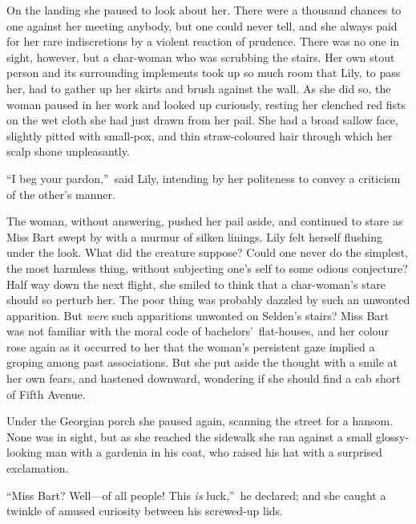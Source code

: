 \documentclass[12pt,a4paper]{book}
\begin{document}
On the landing she paused to look about her. There were a
thousand chances to one against her meeting anybody, but one
could never tell, and she always paid for her rare indiscretions
by a violent reaction of prudence. There was no one in sight,
however, but a char-woman who was scrubbing the stairs. Her own
stout person and its surrounding implements took up so much room
that Lily, to pass her, had to gather up her skirts and brush
against the wall. As she did so, the woman paused in her work and
looked up curiously, resting her clenched red fists on the
wet cloth she had just drawn from her pail. She had a broad
sallow face, slightly pitted with small-pox, and thin
straw-coloured hair through which her scalp shone unpleasantly.





``I beg your pardon,''\ said Lily, intending by her politeness to
convey a criticism of the other's manner.





The woman, without answering, pushed her pail aside, and
continued to stare as Miss Bart swept by with a murmur of silken
linings. Lily felt herself flushing under the look. What did the
creature suppose? Could one never do the simplest, the most
harmless thing, without subjecting one's self to some odious
conjecture? Half way down the next flight, she smiled to think
that a char-woman's stare should so perturb her. The poor thing
was probably dazzled by such an unwonted apparition. But \textit{were}
such apparitions unwonted on Selden's stairs? Miss Bart was not
familiar with the moral code of bachelors'\ flat-houses, and her
colour rose again as it occurred to her that the woman's
persistent gaze implied a groping among past associations. But
she put aside the thought with a smile at her own fears, and
hastened downward, wondering if she should find a cab short of
Fifth Avenue.





Under the Georgian porch she paused again, scanning the street
for a hansom. None was in sight, but as she reached the sidewalk
she ran against a small glossy-looking man with a gardenia in his
coat, who raised his hat with a surprised exclamation.





``Miss Bart? Well---of all people! This \textit{is} luck,''\ he declared; and
she caught a twinkle of amused curiosity between his screwed-up
lids.
\end{document}

